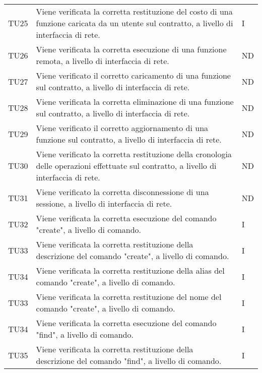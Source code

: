 \begin{longtable}{|C{1.5cm}|C{10cm}|C{1.5cm}|}
	TU25 &
	Viene verificata la corretta restituzione del costo di una funzione caricata da un utente sul contratto, a livello di interfaccia di rete.  &
	I \\

	TU26 &
	Viene verificata la corretta esecuzione di una funzione remota, a livello di interfaccia di rete.  &
	ND \\

	TU27 &
	Viene verificato il corretto caricamento di una funzione sul contratto, a livello di interfaccia di rete.  &
	ND \\

	TU28 &
	Viene verificata la corretta eliminazione di una funzione sul contratto, a livello di interfaccia di rete.  &
	ND \\

	TU29 &
	Viene verificato il corretto aggiornamento di una funzione sul contratto, a livello di interfaccia di rete.  &
	ND \\

	TU30 &
	Viene verificato la corretta restituzione della cronologia delle operazioni effettuate sul contratto, a livello di interfaccia di rete.  &
	ND \\

	TU31 &
	Viene verificato la corretta disconnessione di una sessione, a livello di interfaccia di rete.  &
	ND \\

	TU32 &
	Viene verificata la corretta esecuzione del comando "create", a livello di comando.  &
	I \\

	TU33 &
	Viene verificata la corretta restituzione della descrizione del comando "create", a livello di comando.  &
	I \\

	TU34 &
	Viene verificata la corretta restituzione della alias del comando "create", a livello di comando.  &
	I \\

	TU33 &
	Viene verificata la corretta restituzione del nome del comando "create", a livello di comando.  &
	I \\

	TU34 &
	Viene verificata la corretta esecuzione del comando "find", a livello di comando.  &
	I \\

	TU35 &
	Viene verificata la corretta restituzione della descrizione del comando "find", a livello di comando.  &
	I \\


\end{longtable}
